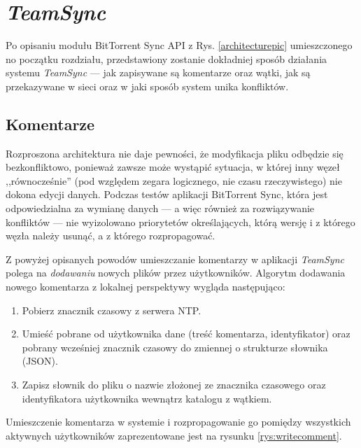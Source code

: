 \section{\emph{TeamSync}}

\label{teamsyncarch}

Po opisaniu modułu BitTorrent Sync API z Rys. \ref{architecturepic} umieszczonego no początku rozdziału, przedstawiony zostanie dokładniej sposób działania systemu \emph{TeamSync} --- jak zapisywane są komentarze oraz wątki, jak są przekazywane w sieci oraz w jaki sposób system unika konfliktów.

\subsection{Komentarze}

\label{archcomments}

Rozproszona architektura nie daje pewności, że modyfikacja pliku odbędzie się bezkonfliktowo, ponieważ zawsze może wystąpić sytuacja, w której inny węzeł ,,równocześnie'' (pod względem zegara logicznego, nie czasu rzeczywistego) nie dokona edycji danych. Podczas testów aplikacji BitTorrent Sync, która jest odpowiedzialna za wymianę danych --- a więc również za rozwiązywanie konfliktów --- nie wyizolowano priorytetów określających, którą wersję i z którego węzła należy usunąć, a z którego rozpropagować.
 
Z powyżej opisanych powodów umieszczanie komentarzy w aplikacji \emph{TeamSync} polega na \emph{dodawaniu} nowych plików przez użytkowników. Algorytm dodawania nowego komentarza z lokalnej perspektywy wygląda następująco:

\begin{enumerate}[noitemsep]
 \item Pobierz znacznik czasowy z serwera NTP.
 
 \item Umieść pobrane od użytkownika dane (treść komentarza, identyfikator) oraz pobrany wcześniej znacznik czasowy do zmiennej o strukturze słownika (JSON).
 
 \item Zapisz słownik do pliku o nazwie złożonej ze znacznika czasowego oraz identyfikatora użytkownika wewnątrz katalogu z wątkiem.
\end{enumerate}

Umieszczenie komentarza w systemie i rozpropagowanie go pomiędzy wszystkich aktywnych użytkowników zaprezentowane jest na rysunku \ref{rys:writecomment}.

